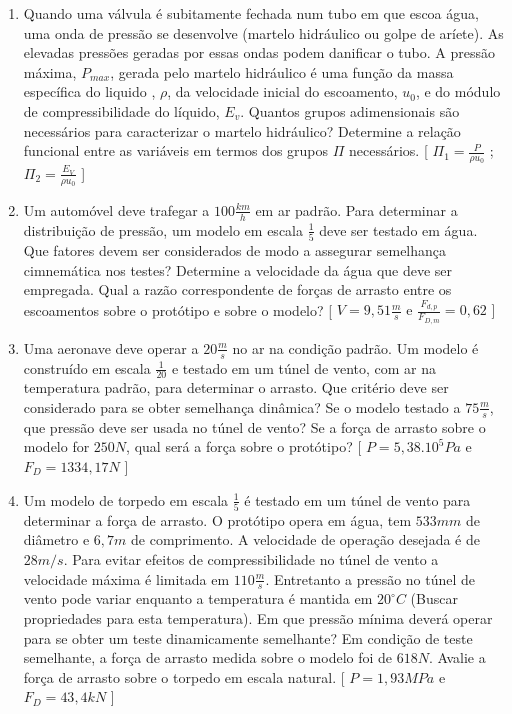 \documentclass[a4paper,12pt]{article}
\begin{document}
\begin{enumerate}
\item Quando uma válvula é subitamente fechada num tubo em que escoa água, uma onda de pressão se desenvolve (martelo hidráulico ou golpe de aríete). As elevadas pressões geradas por essas ondas podem danificar o tubo. A pressão máxima, $P_{max}$, gerada pelo martelo hidráulico é uma função da massa específica do liquido , $\rho$, da velocidade inicial do escoamento, $u_0$, e do módulo de compressibilidade do líquido, $E_v$. Quantos grupos adimensionais são necessários para caracterizar o martelo hidráulico? Determine a relação funcional entre as variáveis em termos dos grupos $\Pi$ necessários.
[ \scriptsize{$\Pi_1 =  \frac{P}{\rho u_0}$ ; $\Pi_2 =  \frac{E_V}{\rho u_0}$ \normalsize ]} \normalsize 
\item Um automóvel deve trafegar a $100 \frac{km}{h}$ em ar padrão. Para determinar a distribuição de pressão, um modelo em escala $\frac{1}{5}$ deve ser testado em água. Que fatores devem ser considerados de modo a assegurar semelhança cimnemática nos testes? Determine a velocidade da água que deve ser empregada. Qual a razão correspondente de forças de arrasto entre os escoamentos sobre o protótipo e sobre o modelo? [ \scriptsize{$V = 9,51 \frac{m}{s}$ e $\frac{F_{d,p}}{F_{D,m}}=0,62$ \normalsize ]} \normalsize 
\item Uma aeronave deve operar a $20  \frac{m}{s}$ no ar na condição padrão. Um modelo é construído em escala $\frac{1}{20}$ e testado em um túnel de vento, com ar na temperatura padrão, para determinar o arrasto. Que critério deve ser considerado para se obter semelhança dinâmica? Se o modelo testado a $75 \frac{m}{s}$, que pressão deve ser usada no túnel de vento? Se a força de arrasto sobre o modelo for $250 N$, qual será a força sobre o protótipo? [ \scriptsize{$P = 5,38.10^5 Pa$ e $F_D = 1334,17 N$ \normalsize ]} \normalsize 
\item Um modelo de torpedo em escala $\frac{1}{5}$ é testado em um túnel de vento para determinar a força de arrasto. O protótipo opera em água, tem $533 mm$ de diâmetro e $6,7 m$ de comprimento. A velocidade de operação desejada é de $28 m/s$. Para evitar efeitos de compressibilidade no túnel de vento a velocidade máxima é limitada em $110 \frac{m}{s}$. Entretanto a pressão no túnel de vento pode variar enquanto a temperatura é mantida em $20^{\circ}C$ (Buscar propriedades para esta temperatura). Em que pressão mínima deverá operar para se obter um teste dinamicamente semelhante? Em condição de teste semelhante, a força de arrasto medida sobre o modelo foi de $618 N$. Avalie a força de arrasto sobre o torpedo em escala natural. [ \scriptsize{$P = 1,93 MPa$ e $F_D = 43,4 kN$ \normalsize ]} \normalsize

\end{enumerate}
\end{document}
